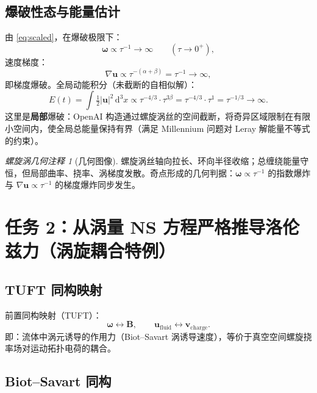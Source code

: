 \documentclass[11pt,a4paper]{article}
\newcommand{\dd}{\mathrm{d}}
\newcommand{\bu}{\bm{u}}
\newcommand{\bom}{\bm{\omega}}
\newcommand{\bB}{\bm{B}}
\newcommand{\bv}{\bm{v}}
\theoremstyle{remark}
\newtheorem{remark}[theorem]{螺旋涡几何注释}
\begin{document}
\subsection{爆破性态与能量估计}

由 \eqref{eq:scaled}，在爆破极限下：
\begin{equation}
\bom\propto\tau^{-1}\to\infty\qquad(\tau\to0^{+}),
\end{equation}
速度梯度：
\begin{equation}
\nabla\bu\propto\tau^{-(\alpha+\beta)}=\tau^{-1}\to\infty,
\end{equation}
即梯度爆破。全局动能积分（未截断的自相似解）：
\begin{equation}
\label{eq:energy}
E(t)=\int\tfrac12|\bu|^2\,\dd^3x\propto\tau^{-4/3}\cdot\tau^{3\beta}=\tau^{-4/3}\cdot\tau^{1}=\tau^{-1/3}\to\infty.
\end{equation}
这里是\textbf{局部}爆破：OpenAI 构造通过螺旋涡丝的空间截断，将奇异区域限制在有限小空间内，使全局总能量保持有界（满足 Millennium 问题对 Leray 解能量不等式的约束）。

\begin{remark}[几何图像]
螺旋涡丝轴向拉长、环向半径收缩；总缠绕能量守恒，但局部曲率、挠率、涡梯度发散。奇点形成的几何判据：$\bom\propto\tau^{-1}$ 的指数爆炸与 $\nabla\bu\propto\tau^{-1}$ 的梯度爆炸同步发生。
\end{remark}

\section{任务 2：从涡量 NS 方程严格推导洛伦兹力（涡旋耦合特例）}

\subsection{TUFT 同构映射}

前置同构映射（TUFT）：
\begin{equation}
\label{eq:isomap}
\bom\longleftrightarrow\bB,\qquad
\bu_{\mathrm{fluid}}\longleftrightarrow\bv_{\mathrm{charge}}.
\end{equation}
即：流体中涡元诱导的作用力（Biot--Savart 涡诱导速度），等价于真空空间螺旋挠率场对运动拓扑电荷的耦合。

\subsection{Biot--Savart 同构}
\end{document}
